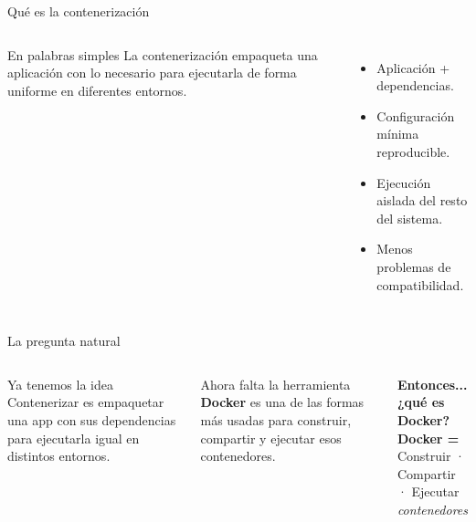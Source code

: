 \documentclass[aspectratio=169]{beamer}
\begin{document}
\begin{frame}{Qué es la contenerización}
  \begin{columns}[T]
    \small
    \begin{block}{En palabras simples}
      La contenerización empaqueta una aplicación con lo necesario para ejecutarla de forma uniforme en diferentes entornos.
    \end{block}
    \begin{itemize}
      \item Aplicación + dependencias.
      \item Configuración mínima reproducible.
      \item Ejecución aislada del resto del sistema.
      \item Menos problemas de compatibilidad.
    \end{itemize}
    \centering
  \end{columns}
\end{frame}

\begin{frame}{La pregunta natural}
  \begin{columns}[c]
    \small
    \begin{block}{Ya tenemos la idea}
      Contenerizar es empaquetar una app con sus dependencias para ejecutarla igual en distintos entornos.
    \end{block}
    \vspace{0.18cm}
    \begin{alertblock}{Ahora falta la herramienta}
      \textbf{Docker} es una de las formas más usadas para construir, compartir y ejecutar esos contenedores.
    \end{alertblock}
    \vspace{0.1cm}
    {\color{dockerblue}\bfseries Entonces... ¿qué es Docker?}
    \centering
    {\color{dockerblue}\fontsize{64}{70}\selectfont\faDocker}\\[0.2cm]
    {\large\bfseries Docker =}\\[0.1cm]
    {\small Construir · Compartir · Ejecutar}\\[0.1cm]
    {\small\itshape contenedores}
  \end{columns}
\end{frame}
\end{document}
